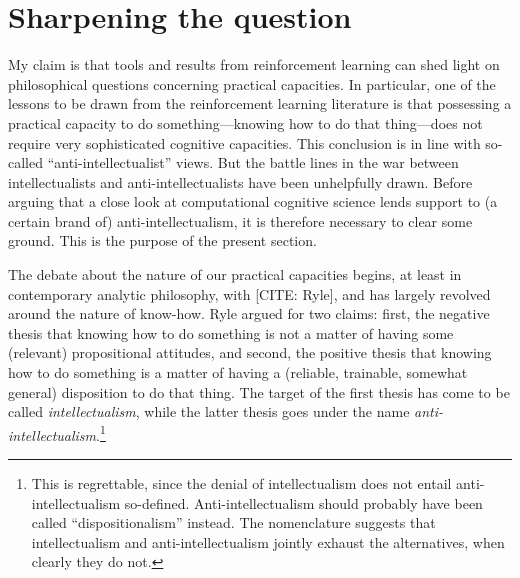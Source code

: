 \section{Sharpening the question}

My claim is that tools and results from reinforcement learning can shed light on philosophical questions concerning practical capacities.
In particular, one of the lessons to be drawn from the reinforcement learning literature is that possessing a practical capacity to do something---knowing how to do that thing---does not require very sophisticated cognitive capacities.
This conclusion is in line with so-called ``anti-intellectualist'' views.
But the battle lines in the war between intellectualists and anti-intellectualists have been unhelpfully drawn.
Before arguing that a close look at computational cognitive science lends support to (a certain brand of) anti-intellectualism, it is therefore necessary to clear some ground.
This is the purpose of the present section.

The debate about the nature of our practical capacities begins, at least in contemporary analytic philosophy, with [CITE: Ryle], and has largely revolved around the nature of know-how.
Ryle argued for two claims: first, the negative thesis that knowing how to do something is not a matter of having some (relevant) propositional attitudes, and second, the positive thesis that knowing how to do something is a matter of having a (reliable, trainable, somewhat general) disposition to do that thing.
The target of the first thesis has come to be called \emph{intellectualism}, while the latter thesis goes under the name \emph{anti-intellectualism}.\footnote{This is regrettable, since the denial of intellectualism does not entail anti-intellectualism so-defined.
Anti-intellectualism should probably have been called ``dispositionalism'' instead.
The nomenclature suggests that intellectualism and anti-intellectualism jointly exhaust the alternatives, when clearly they do not.}

